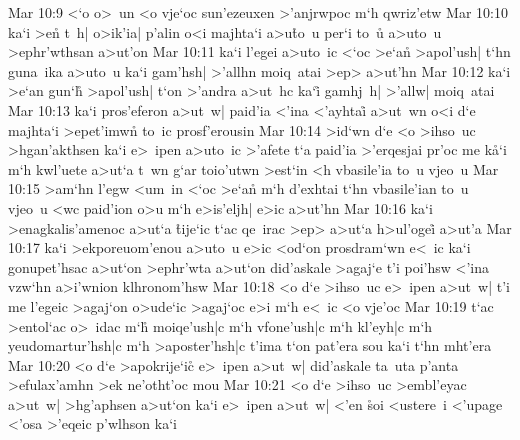 \vs Mar 10:9
<`o
o>~un
<o
vje`oc
sun'ezeuxen
>'anjrwpoc
m`h
qwriz'etw\bibvsend
\vs Mar 10:10
ka`i
>en\r{}
t~h|
o>ik'ia|
p'alin
o<i
majhta`i
a>u\r{t}o~u
per`i
to~u\r{}
a>uto~u
>ephr'wthsan
a>ut'on\bibvsend
\vs Mar 10:11
ka`i
l'egei
a>uto~ic
<`oc
>e`a\r{n}
>apol'ush|
t`hn
guna~ika
a>uto~u
ka`i
gam'hsh|
>'allhn
moiq~atai
>ep>
a>ut'hn\bibvsend
\vs Mar 10:12
ka`i
>e`an
gun`h\r{}
>apol'ush|
t`on
>'andra
a>ut~hc
ka`i\r{}
gamhj~h|
>'allw|
moiq~atai\bibvsend
\vs Mar 10:13
ka`i
pros'eferon
a>ut~w|
paid'ia
<'ina
<'ayhtai\r{}
a>ut~wn
o<i
d`e
majhta`i
>epet'imwn\r{}
to~ic
prosf'erousin\bibvsend
\vs Mar 10:14
>id`wn
d`e
<o
>ihso~uc
>hgan'akthsen
ka`i
e>~ipen
a>uto~ic
>'afete
t`a
paid'ia
>'erqesjai
pr'oc
me
k\r{a}`i
m`h
kwl'uete
a>ut`a
t~wn
g`ar
toio'utwn
>est`in
<h
vbasile'ia
to~u
vjeo~u\bibvsend
\vs Mar 10:15
>am`hn
l'egw
<um~in
<`oc
>e`a\r{n}
m`h
d'exhtai
t`hn
vbasile'ian
to~u
vjeo~u
<wc
paid'ion
o>u
m`h
e>is'eljh|
e>ic
a>ut'hn\bibvsend
\vs Mar 10:16
ka`i
>enagkalis'amenoc
a>ut`a
\r{t}ije`ic
t`ac
qe~irac
>ep>
a>ut`a
h>ul'ogei\r{}
a>ut'a\bibvsend
\vs Mar 10:17
ka`i
>ekporeuom'enou
a>uto~u
e>ic
<od`on
prosdram`wn
e<~ic
ka`i
gonupet'hsac
a>ut`on
>ephr'wta
a>ut`on
did'askale
>agaj`e
t'i
poi'hsw
<'ina
vzw`hn
a>i'wnion
klhronom'hsw\bibvsend
\vs Mar 10:18
<o
d`e
>ihso~uc
e>~ipen
a>ut~w|
t'i
me
l'egeic
>agaj`on
o>ude`ic
>agaj`oc
e>i
m`h
e<~ic
<o
vje'oc\bibvsend
\vs Mar 10:19
t`ac
>entol`ac
o>~idac
m`h\r{}
moiqe'ush|c
m`h
vfone'ush|c
m`h
kl'eyh|c
m`h
yeudomartur'hsh|c
m`h
>aposter'hsh|c
t'ima
t`on
pat'era
sou
ka`i
t`hn
mht'era\bibvsend
\vs Mar 10:20
<o
d`e
>apokrije`ic\r{}
e>~ipen
a>ut~w|
did'askale
ta~uta
p'anta
>efulax'amhn
>ek
ne'otht'oc
mou\bibvsend
\vs Mar 10:21
<o
d`e
>ihso~uc
>embl'eyac
a>ut~w|
>hg'aphsen
a>ut`on
ka`i
e>~ipen
a>ut~w|
<'en
\r{s}oi
<ustere~i
<'upage
<'osa
>'eqeic
p'wlhson
ka`i

